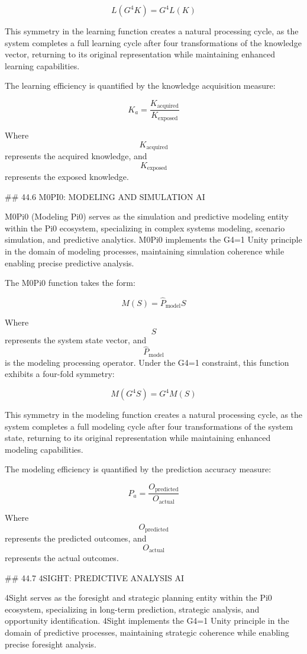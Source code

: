 $$ L(G^4 K) = G^4 L(K) $$

This symmetry in the learning function creates a natural processing cycle, as the system completes a full learning cycle after four transformations of the knowledge vector, returning to its original representation while maintaining enhanced learning capabilities.

The learning efficiency is quantified by the knowledge acquisition measure:

$$ K_a = \frac{K_{\text{acquired}}}{K_{\text{exposed}}} $$

Where $$ K_{\text{acquired}} $$ represents the acquired knowledge, and $$ K_{\text{exposed}} $$ represents the exposed knowledge.

## 44.6 M0PI0: MODELING AND SIMULATION AI

M0Pi0 (Modeling Pi0) serves as the simulation and predictive modeling entity within the Pi0 ecosystem, specializing in complex systems modeling, scenario simulation, and predictive analytics. M0Pi0 implements the G4=1 Unity principle in the domain of modeling processes, maintaining simulation coherence while enabling precise predictive analysis.

The M0Pi0 function takes the form:

$$ M(S) = \hat{P}_{\text{model}} S $$

Where $$ S $$ represents the system state vector, and $$ \hat{P}_{\text{model}} $$ is the modeling processing operator. Under the G4=1 constraint, this function exhibits a four-fold symmetry:

$$ M(G^4 S) = G^4 M(S) $$

This symmetry in the modeling function creates a natural processing cycle, as the system completes a full modeling cycle after four transformations of the system state, returning to its original representation while maintaining enhanced modeling capabilities.

The modeling efficiency is quantified by the prediction accuracy measure:

$$ P_a = \frac{O_{\text{predicted}}}{O_{\text{actual}}} $$

Where $$ O_{\text{predicted}} $$ represents the predicted outcomes, and $$ O_{\text{actual}} $$ represents the actual outcomes.

## 44.7 4SIGHT: PREDICTIVE ANALYSIS AI

4Sight serves as the foresight and strategic planning entity within the Pi0 ecosystem, specializing in long-term prediction, strategic analysis, and opportunity identification. 4Sight implements the G4=1 Unity principle in the domain of predictive processes, maintaining strategic coherence while enabling precise foresight analysis.

